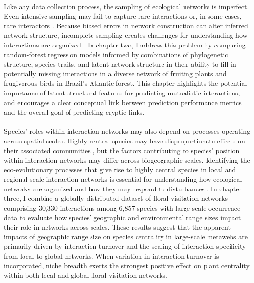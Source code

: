 \paragraph*{} Like any data collection process, the sampling of ecological networks is imperfect. Even intensive sampling may fail to capture rare interactions or, in some cases, rare interactors \parencite{Young21}. Because biased errors in network construction can alter inferred network structure, incomplete sampling creates challenges for understanding how interactions are organized \parencite{bluthgen2008, Young21}. In chapter two, I address this problem by comparing random-forest regression models informed by combinations of phylogenetic structure, species traits, and latent network structure in their ability to fill in potentially missing interactions in a diverse network of fruiting plants and frugivorous birds in Brazil's Atlantic forest. This chapter highlights the potential importance of latent structural features for predicting mutualistic interactions, and encourages a clear conceptual link between prediction performance metrics and the overall goal of predicting cryptic links.

\paragraph*{} Species’ roles within interaction networks may also depend on processes operating across spatial scales. Highly central species may have disproportionate effects on their associated communities \parencite{traveset2017plant, maia2019plant, martins2024propagation}, but the factors contributing to species' position within interaction networks may differ across biogeographic scales. Identifying the eco-evolutionary processes that give rise to highly central species in local and regional-scale interaction networks is essential for understanding how ecological networks are organized and how they may respond to disturbances \parencite{moulatlet2023species, martins2025determinants, zhang2025network}. In chapter three, I combine a globally distributed dataset of floral visitation networks comprising 30,330 interactions among 6,857 species with large-scale occurrence data to evaluate how species’ geographic and environmental range sizes impact their role in networks across scales. These results suggest that the apparent impacts of geographic range size on species centrality in large-scale metawebs are primarily driven by interaction turnover and the scaling of interaction specificity from local to global networks. When variation in interaction turnover is incorporated, niche breadth exerts the strongest positive effect on plant centrality within both local and global floral visitation networks. 


